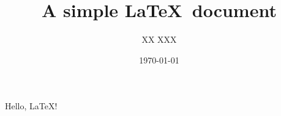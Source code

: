 \documentclass[a4paper]{article}
\title{A simple \LaTeX\ document}
\author{XX XXX}
\date{\today}
\begin{document}
        \maketitle
        Hello, \LaTeX !
\end{document}
